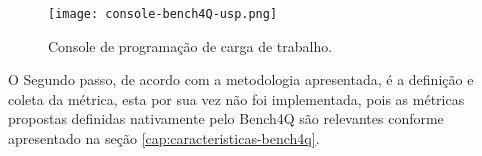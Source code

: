 \begin{figure}[htb]
	\caption{Console de programação de carga de trabalho.}
	\label{fig:interface-criada-beanch4q}
	\centering
	\texttt{[image: console-bench4Q-usp.png]}
\end{figure}
	
	


O Segundo passo, de acordo com a metodologia apresentada, é a definição e coleta da métrica, esta por sua vez não foi implementada, pois as métricas propostas definidas nativamente pelo Bench4Q são relevantes conforme apresentado na seção \ref{cap:caracteristicas-bench4q}.

